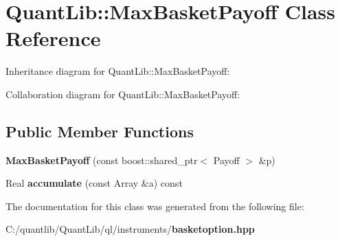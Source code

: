 \section{Quant\+Lib\+:\+:Max\+Basket\+Payoff Class Reference}
\label{class_quant_lib_1_1_max_basket_payoff}


Inheritance diagram for Quant\+Lib\+:\+:Max\+Basket\+Payoff\+:


Collaboration diagram for Quant\+Lib\+:\+:Max\+Basket\+Payoff\+:
\subsection*{Public Member Functions}
\begin{DoxyCompactItemize}
\item 
{\bfseries Max\+Basket\+Payoff} (const boost\+::shared\+\_\+ptr$<$ Payoff $>$ \&p)\label{class_quant_lib_1_1_max_basket_payoff_a4fae7d05bc0428dbaf7b2926fdeab6b9}

\item 
Real {\bfseries accumulate} (const Array \&a) const \label{class_quant_lib_1_1_max_basket_payoff_a13ca30dcb9ea55bf45893d875cd3b98f}

\end{DoxyCompactItemize}


The documentation for this class was generated from the following file\+:\begin{DoxyCompactItemize}
\item 
C\+:/quantlib/\+Quant\+Lib/ql/instruments/{\bf basketoption.\+hpp}\end{DoxyCompactItemize}
